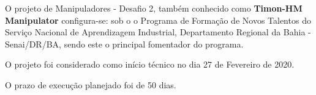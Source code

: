 O projeto de Manipuladores - Desafio 2, também conhecido como \textbf{Timon-HM Manipulator} configura-se: sob o o Programa de Formação de Novos Talentos do Serviço Nacional de Aprendizagem Industrial, Departamento Regional da Bahia - Senai/DR/BA, sendo este o principal fomentador do programa. 

O projeto foi considerado como início técnico no dia 27 de Fevereiro de 2020. 

O prazo de execução planejado foi de 50 dias.	


